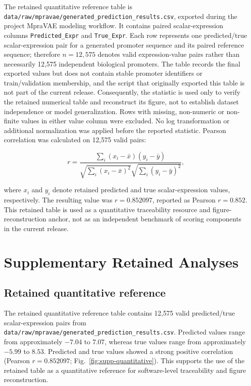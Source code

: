 \documentclass[10pt]{article}
\begin{document}
The retained quantitative reference table is \texttt{data/raw/mpravae/generated\_prediction\_results.csv}, exported during the project MpraVAE modeling workflow. It contains paired scalar-expression columns \texttt{Predicted\_Expr} and \texttt{True\_Expr}. Each row represents one predicted/true scalar-expression pair for a generated promoter sequence and its paired reference sequence; therefore \(n=12{,}575\) denotes valid expression-value pairs rather than necessarily 12,575 independent biological promoters. The table records the final exported values but does not contain stable promoter identifiers or train/validation membership, and the script that originally exported this table is not part of the current release. Consequently, the statistic is used only to verify the retained numerical table and reconstruct its figure, not to establish dataset independence or model generalization. Rows with missing, non-numeric or non-finite values in either value column were excluded. No log transformation or additional normalization was applied before the reported statistic. Pearson correlation was calculated on 12,575 valid pairs:

\[
r =
\frac{\sum_i (x_i-\bar{x})(y_i-\bar{y})}
{\sqrt{\sum_i (x_i-\bar{x})^2}\sqrt{\sum_i (y_i-\bar{y})^2}},
\]

where \(x_i\) and \(y_i\) denote retained predicted and true scalar-expression values, respectively. The resulting value was \(r = 0.852097\), reported as Pearson \(r = 0.852\). This retained table is used as a quantitative traceability resource and figure-reconstruction anchor, not as an independent benchmark of scoring components in the current release.

\section{Supplementary Retained Analyses}

\subsection{Retained quantitative reference}

The retained quantitative reference table contains 12,575 valid predicted/true scalar-expression pairs from \texttt{data/raw/mpravae/generated\_prediction\_results.csv}. Predicted values range from approximately \(-7.04\) to \(7.07\), whereas true values range from approximately \(-5.99\) to \(8.53\). Predicted and true values showed a strong positive correlation (Pearson \(r = 0.852097\); Fig.~\ref{fig:supp-quantitative}). This supports the use of the retained table as a quantitative reference for software-level traceability and figure reconstruction.
\end{document}
